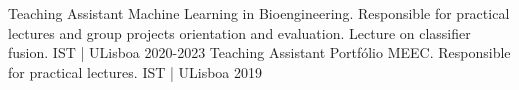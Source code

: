 

\begin{cvhonors}

     \cvhonor
    {Teaching Assistant} %
    {Machine Learning in Bioengineering. Responsible for practical lectures and group projects orientation and evaluation. Lecture on classifier fusion.} %
    {IST | ULisboa} %
    {2020-2023} %
\cvhonor
    {Teaching Assistant} %
    {Portfólio MEEC. Responsible for practical lectures.} %
    {IST | ULisboa} %
    {2019} %

\end{cvhonors}
